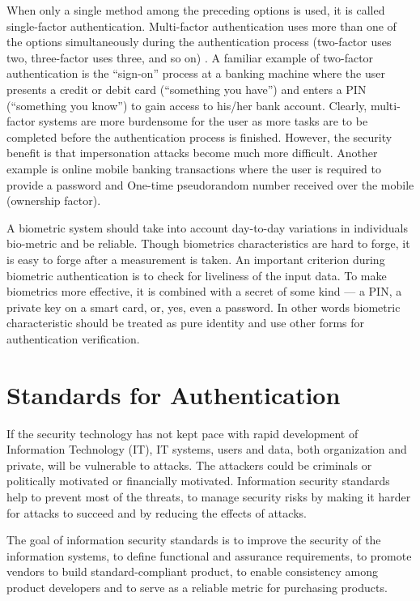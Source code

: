 \begin{multicols}{2}
When only a single method among the preceding options is used, it is called single-factor authentication. Multi-factor authentication uses more than one of the options simultaneously during the authentication process (two-factor uses two, three-factor uses three, and so on) \cite{chap2-key2}. A familiar example of two-factor authentication is the ``sign-on'' process at a banking machine where the user presents a credit or debit card (``something you have'') and enters a PIN (``something you know'') to gain access to his/her bank account. Clearly, multi-factor systems are more burdensome for the user as more tasks are to be completed before the authentication process is finished. However, the security benefit is that impersonation attacks become much more difficult. Another example is online mobile banking transactions where the user is required to provide a password and One-time pseudorandom number received over the mobile (ownership factor).

A biometric system should take into account day-to-day variations in individuals bio-metric and be reliable. Though biometrics characteristics are hard to forge, it is easy to forge after a measurement is taken. An important criterion during biometric authentication is to check for liveliness of the input data. To make biometrics more effective, it is combined with a secret of some kind --- a PIN, a private key on a smart card, or, yes, even a password. In other words biometric characteristic should be treated as pure identity and use other forms for authentication verification.

\section*{Standards for Authentication}

If the security technology has not kept pace with rapid development of Information Technology (IT), IT systems, users and data, both organization and private, will be vulnerable to attacks. The attackers could be criminals or politically motivated or financially motivated. Information security standards help to prevent most of the threats, to manage security risks by making it harder for attacks to succeed and by reducing the effects of attacks.

The goal of information security standards is to improve the security of the information systems, to define functional and assurance requirements, to promote vendors to build standard-compliant product, to enable consistency among product developers and to serve as a reliable metric for purchasing products.


\end{multicols}

